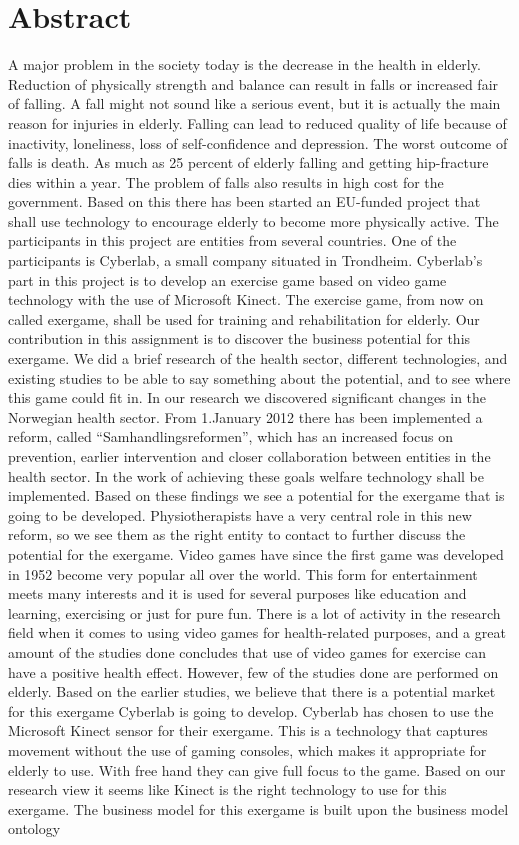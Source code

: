 \documentclass[b5paper,twoside,openright,11pt]{report}
\begin{document}
\chapter*{Abstract}
A major problem in the society today is the decrease in the health in elderly. Reduction of physically strength and balance can result in falls or increased fair of falling. A fall might not sound like a serious event, but it is actually the main reason for injuries in elderly. Falling can lead to reduced quality of life because of inactivity, loneliness, loss of self-confidence and depression. The worst outcome of falls is death. As much as 25 percent of elderly falling and getting hip-fracture dies within a year. The problem of falls also results in high cost for the government. Based on this there has been started an EU-funded project that shall use technology to encourage elderly to become more physically active.  The participants in this project are entities from several countries. One of the participants is Cyberlab, a small company situated in Trondheim. Cyberlab’s part in this project is to develop an exercise game based on video game technology with the use of Microsoft Kinect.  The exercise game, from now on called exergame, shall be used for training and rehabilitation for elderly. Our contribution in this assignment is to discover the business potential for this exergame. We did a brief research of the health sector, different technologies, and existing studies to be able to say something about the potential, and to see where this game could fit in. In our research we discovered significant changes in the Norwegian health sector. From 1.January 2012 there has been implemented a reform, called “Samhandlingsreformen”, which has an increased focus on prevention, earlier intervention and closer collaboration between entities in the health sector. In the work of achieving these goals welfare technology shall be implemented. Based on these findings we see a potential for the exergame that is going to be developed. Physiotherapists have a very central role in this new reform, so we see them as the right entity to contact to further discuss the potential for the exergame.  Video games have since the first game was developed in 1952 become very popular all over the world. This form for entertainment meets many interests and it is used for several purposes like education and learning, exercising or just for pure fun. There is a lot of activity in the research field when it comes to using video games for health-related purposes, and a great amount of the studies done concludes that use of video games for exercise can have a positive health effect. However, few of the studies done are performed on elderly. Based on the earlier studies, we believe that there is a potential market for this exergame Cyberlab is going to develop. Cyberlab has chosen to use the Microsoft Kinect sensor for their exergame. This is a technology that captures movement without the use of gaming consoles, which makes it appropriate for elderly to use. With free hand they can give full focus to the game. Based on our research view it seems like Kinect is the right technology to use for this exergame. The business model for this exergame is built upon the business model ontology 
\end{document}
